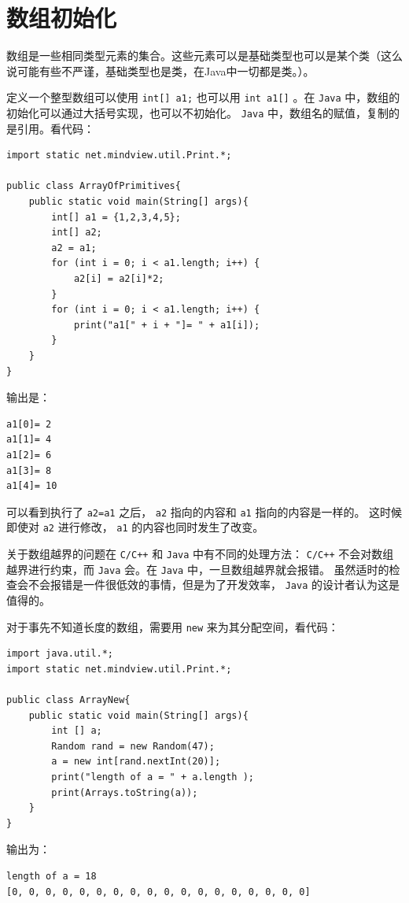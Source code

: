 \documentclass[10pt,a4paper,UTF8]{article}
\begin{document}
\section{数组初始化}
\label{sec:org8574756}


数组是一些相同类型元素的集合。这些元素可以是基础类型也可以是某个类（这么说可能有些不严谨，基础类型也是类，在Java中一切都是类。）。

定义一个整型数组可以使用 \texttt{int[] a1;} 也可以用 \texttt{int a1[]} 。在 \texttt{Java} 中，数组的初始化可以通过大括号实现，也可以不初始化。 \texttt{Java} 中，数组名的赋值，复制的是引用。看代码：
\lstset{language=C,label= ,caption= ,captionpos=b,firstnumber=1,numbers=left}
\begin{lstlisting}
import static net.mindview.util.Print.*;

public class ArrayOfPrimitives{
    public static void main(String[] args){
        int[] a1 = {1,2,3,4,5};
        int[] a2;
        a2 = a1;
        for (int i = 0; i < a1.length; i++) {
            a2[i] = a2[i]*2;
        }
        for (int i = 0; i < a1.length; i++) {
            print("a1[" + i + "]= " + a1[i]);
        }
    }
}
\end{lstlisting}
输出是：
\begin{verbatim}
a1[0]= 2
a1[1]= 4
a1[2]= 6
a1[3]= 8
a1[4]= 10
\end{verbatim}
可以看到执行了 \texttt{a2=a1} 之后， \texttt{a2} 指向的内容和 \texttt{a1} 指向的内容是一样的。 这时候即使对 \texttt{a2} 进行修改， \texttt{a1} 的内容也同时发生了改变。

关于数组越界的问题在 \texttt{C/C++} 和 \texttt{Java} 中有不同的处理方法： \texttt{C/C++} 不会对数组越界进行约束，而 \texttt{Java} 会。在 \texttt{Java} 中，一旦数组越界就会报错。 虽然适时的检查会不会报错是一件很低效的事情，但是为了开发效率， \texttt{Java} 的设计者认为这是值得的。

对于事先不知道长度的数组，需要用 \texttt{new} 来为其分配空间，看代码：

\lstset{language=C,label= ,caption= ,captionpos=b,firstnumber=1,numbers=left}
\begin{lstlisting}
import java.util.*;
import static net.mindview.util.Print.*;

public class ArrayNew{
    public static void main(String[] args){
        int [] a;
        Random rand = new Random(47);
        a = new int[rand.nextInt(20)];
        print("length of a = " + a.length );
        print(Arrays.toString(a));
    }
}
\end{lstlisting}
输出为：
\begin{verbatim}
length of a = 18
[0, 0, 0, 0, 0, 0, 0, 0, 0, 0, 0, 0, 0, 0, 0, 0, 0, 0]
\end{verbatim}
\end{document}
